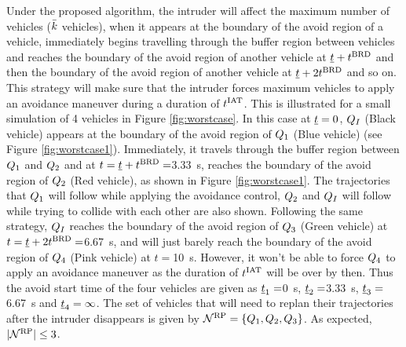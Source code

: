 Under the proposed algorithm, the intruder will affect the maximum number of vehicles ($\bar{k}$ vehicles), when it appears at the boundary of the avoid region of a vehicle, immediately begins travelling through the buffer region between vehicles and reaches the boundary of the avoid region of another vehicle at $\underline{t} + t^\text{BRD}$ and then the boundary of the avoid region of another vehicle at $\underline{t} + 2t^\text{BRD}$ and so on. This strategy will make sure that the intruder forces maximum vehicles to apply an avoidance maneuver during a duration of $t^\text{IAT}$. This is illustrated for a small simulation of 4 vehicles in Figure \ref{fig:worstcase}. In this case at $\underline{t} = 0$, $Q_{I}$ (Black vehicle) appears at the boundary of the avoid region of $Q_1$ (Blue vehicle) (see Figure \ref{fig:worstcase1}). Immediately, it travels through the buffer region between $Q_1$ and $Q_2$ and at $t = \underline{t} + t^\text{BRD} = $\SI{3.33}{\s}, reaches the boundary of the avoid region of $Q_2$ (Red vehicle), as shown in Figure \ref{fig:worstcase1}. The trajectories that $Q_1$ will follow while applying the avoidance control, $Q_2$ and $Q_{I}$ will follow while trying to collide with each other are also shown. Following the same strategy, $Q_{I}$ reaches the boundary of the avoid region of $Q_3$ (Green vehicle) at $t = \underline{t} + 2t^\text{BRD} = $\SI{6.67}{\s}, and will just barely reach the boundary of the avoid region of $Q_4$ (Pink vehicle) at $t = $\SI{10}{\s}. However, it won't be able to force $Q_4$ to apply an avoidance maneuver as the duration of $t^\text{IAT}$ will be over by then. Thus the avoid start time of the four vehicles are given as $\underline{t}_1 = $\SI{0}{\s}, $\underline{t}_2 = $\SI{3.33}{\s}, $\underline{t}_3 = $\SI{6.67}{\s} and $\underline{t}_4 = \infty$. The set of vehicles that will need to replan their trajectories after the intruder disappears is given by $\mathcal{N}^\text{RP} = \{Q_1, Q_2, Q_3\}$. As expected, $|\mathcal{N}^\text{RP}| \leq 3$.    
